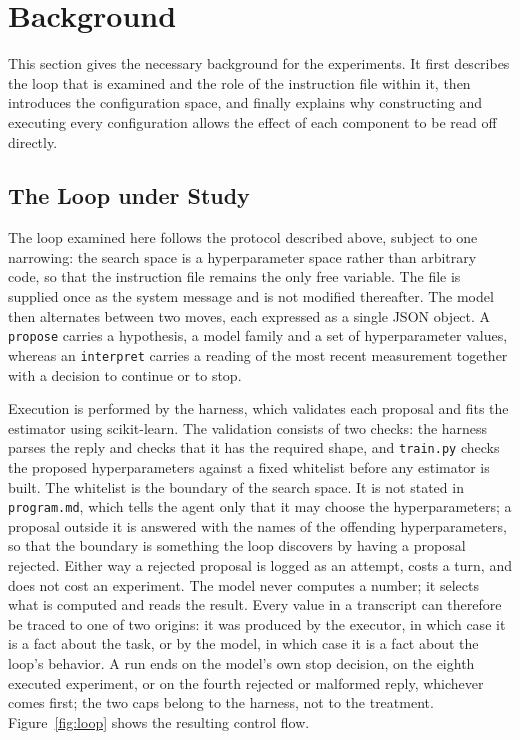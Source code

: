 \documentclass[11pt]{article}
\begin{document}
\section{Background}
\label{sec:background}

This section gives the necessary background for the experiments. It first describes the loop that is examined and the role of the instruction file within it, then introduces the configuration space, and finally explains why constructing and executing every configuration allows the effect of each component to be read off directly.

\subsection{The Loop under Study}

The loop examined here follows the protocol described above, subject to one narrowing: the search space is a hyperparameter space rather than arbitrary code, so that the instruction file remains the only free variable. The file is supplied once as the system message and is not modified thereafter. The model then alternates between two moves, each expressed as a single JSON object. A \texttt{propose} carries a hypothesis, a model family and a set of hyperparameter values, whereas an \texttt{interpret} carries a reading of the most recent measurement together with a decision to continue or to stop.

Execution is performed by the harness, which validates each proposal and fits the estimator using scikit-learn. The validation consists of two checks: the harness parses the reply and checks that it has the required shape, and \texttt{train.py} checks the proposed hyperparameters against a fixed whitelist before any estimator is built. The whitelist is the boundary of the search space. It is not stated in \texttt{program.md}, which tells the agent only that it may choose the hyperparameters; a proposal outside it is answered with the names of the offending hyperparameters, so that the boundary is something the loop discovers by having a proposal rejected. Either way a rejected proposal is logged as an attempt, costs a turn, and does not cost an experiment. The model never computes a number; it selects what is computed and reads the result. Every value in a transcript can therefore be traced to one of two origins: it was produced by the executor, in which case it is a fact about the task, or by the model, in which case it is a fact about the loop's behavior. A run ends on the model's own stop decision, on the eighth executed experiment, or on the fourth rejected or malformed reply, whichever comes first; the two caps belong to the harness, not to the treatment. Figure~\ref{fig:loop} shows the resulting control flow.
\end{document}
